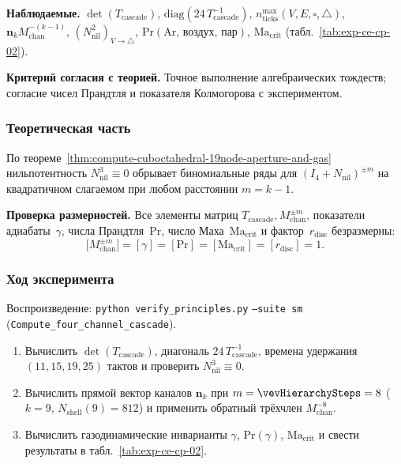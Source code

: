 \textbf{Наблюдаемые.}
$\det(T_{\mathrm{cascade}})$, $\mathrm{diag}(24\,T_{\mathrm{cascade}}^{-1})$, $n_{\mathrm{ticks}}^{\max}(V,E,\square,\triangle)$, $\mathbf{n}_k M_{\mathrm{chan}}^{-(k-1)}$, $(N_{\mathrm{nil}}^2)_{V\to\triangle}$, $\mathrm{Pr}(\text{Ar, воздух, пар})$, $\mathrm{Ma}_{\mathrm{crit}}$ (табл.~\ref{tab:exp-ce-cp-02}).

\textbf{Критерий согласия с теорией.}
Точное выполнение алгебраических тождеств; согласие чисел Прандтля и показателя Колмогорова с экспериментом.

\subsubsection*{Теоретическая часть}
По теореме~\ref{thm:compute-cuboctahedral-19node-aperture-and-gas} нильпотентность $N_{\mathrm{nil}}^3 \equiv 0$ обрывает биномиальные ряды для $(I_4 + N_{\mathrm{nil}})^{\pm m}$ на квадратичном слагаемом при любом расстоянии $m = k - 1$.

\textbf{Проверка размерностей.}
Все элементы матриц $T_{\mathrm{cascade}}, M_{\mathrm{chan}}^{\pm m}$, показатели адиабаты~$\gamma$, числа Прандтля~$\mathrm{Pr}$, число Маха~$\mathrm{Ma}_{\mathrm{crit}}$ и фактор~$r_{\mathrm{disc}}$ безразмерны:
\[
  \bigl[M_{\mathrm{chan}}^{\pm m}\bigr] = [\gamma] = [\mathrm{Pr}] = [\mathrm{Ma}_{\mathrm{crit}}] = [r_{\mathrm{disc}}] = 1.
\]

\subsubsection*{Ход эксперимента}
{\sloppy Воспроизведение: \texttt{python verify\_principles.py} \texttt{--suite sm} (\texttt{Compute\_four\_channel\_cascade}).\par}

\begin{enumerate}[label=\textbf{Шаг \arabic*:},leftmargin=*,itemsep=0.35em]
\item Вычислить $\det(T_{\mathrm{cascade}})$, диагональ $24\,T_{\mathrm{cascade}}^{-1}$, времена удержания $(11,15,19,25)$ тактов и проверить $N_{\mathrm{nil}}^3 \equiv 0$.
\item Вычислить прямой вектор каналов $\mathbf{n}_k$ при $m = \vevHierarchySteps = 8$ ($k=9$, $N_{\mathrm{shell}}(9)=812$) и применить обратный трёхчлен $M_{\mathrm{chan}}^{-8}$.
\item Вычислить газодинамические инварианты $\gamma$, $\mathrm{Pr}(\gamma)$, $\mathrm{Ma}_{\mathrm{crit}}$ и свести результаты в табл.~\ref{tab:exp-ce-cp-02}.
\end{enumerate}

